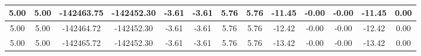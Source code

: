\begin{table}[htbp]
\begin{adjustbox}{angle=90}
\begin{tabular}{|c|c|c|c|c|c|c|c|c|c|c|c|c|}
 5.00 & 5.00 & -142463.75 & -142452.30 & -3.61 & -3.61 & 5.76 & 5.76 & -11.45 & -0.00 & -0.00 & -11.45 & 0.00\\ \hline
 5.00 & 5.00 & -142464.72 & -142452.30 & -3.61 & -3.61 & 5.76 & 5.76 & -12.42 & -0.00 & -0.00 & -12.42 & 0.00\\ \hline
 5.00 & 5.00 & -142465.72 & -142452.30 & -3.61 & -3.61 & 5.76 & 5.76 & -13.42 & -0.00 & -0.00 & -13.42 & 0.00\\ \hline
            \end{tabular}
        \end{adjustbox}
        \caption{}
        \label{}
    \end{table}
    